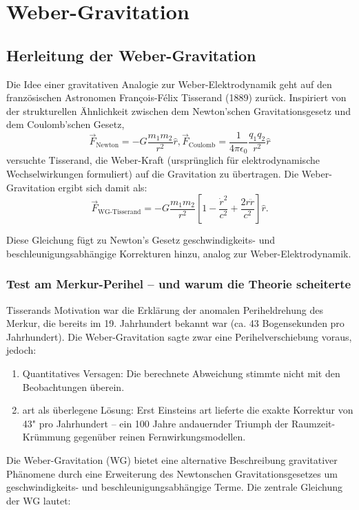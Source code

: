 \chapter{Weber-Gravitation}
\section{Herleitung der Weber-Gravitation}
Die Idee einer gravitativen Analogie zur Weber-Elektrodynamik geht auf den französischen Astronomen François-Félix Tisserand (1889) zurück. Inspiriert von der strukturellen
Ähnlichkeit zwischen dem Newton’schen Gravitationsgesetz und dem Coulomb’schen Gesetz,
\[
\vec{F}_{\text{Newton}} = -G \frac{m_1 m_2}{r^2} \hat{r}, \vec{F}_{\text{Coulomb}} = \frac{1}{4 \pi \epsilon_0} \frac{q_1 q_2}{r^2} \hat{r}
\]
versuchte Tisserand, die Weber-Kraft (ursprünglich für elektrodynamische Wechselwirkungen formuliert) auf die Gravitation zu übertragen. Die Weber-Gravitation ergibt sich damit als:
\[
\vec{F}_{\text{WG-Tisserand}} = -G \frac{m_1 m_2}{r^2} \left[ 1 - \frac{\dot{r}^2}{c^2} + \frac{2 r \ddot{r}}{c^2} \right] \hat{r}.
\]

Diese Gleichung fügt zu Newton’s Gesetz geschwindigkeits- und beschleunigungsabhängige Korrekturen hinzu, analog zur Weber-Elektrodynamik.
\subsection{Test am Merkur-Perihel – und warum die Theorie scheiterte}
Tisserands Motivation war die Erklärung der anomalen Periheldrehung des Merkur, die bereits im 19. Jahrhundert bekannt war (ca. 43 Bogensekunden pro Jahrhundert).
Die Weber-Gravitation sagte zwar eine Perihelverschiebung voraus, jedoch:
\begin{enumerate}
    \item Quantitatives Versagen: Die berechnete Abweichung stimmte nicht mit den Beobachtungen überein.
    \item \gls{art} als überlegene Lösung: Erst Einsteins \gls{art} lieferte die exakte Korrektur von 43" pro Jahrhundert – ein 100 Jahre andauernder Triumph der
    Raumzeit-Krümmung gegenüber reinen Fernwirkungsmodellen.
\end{enumerate}

Die Weber-Gravitation (WG) bietet eine alternative Beschreibung gravitativer Phänomene durch eine Erweiterung des Newtonschen Gravitationsgesetzes um
geschwindigkeits- und beschleunigungsabhängige Terme. Die zentrale Gleichung der WG lautet:

